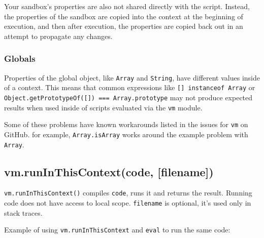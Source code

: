 Your sandbox's properties are also not shared directly with the script.
Instead, the properties of the sandbox are copied into the context at
the beginning of execution, and then after execution, the properties are
copied back out in an attempt to propagate any changes.

\subsubsection{Globals}

Properties of the global object, like \texttt{Array} and
\texttt{String}, have different values inside of a context. This means
that common expressions like \texttt{{[}{]} instanceof Array} or
\texttt{Object.getPrototypeOf({[}{]}) === Array.prototype} may not
produce expected results when used inside of scripts evaluated via the
\texttt{vm} module.

Some of these problems have known workarounds listed in the issues for
\texttt{vm} on GitHub. for example, \texttt{Array.isArray} works around
the example problem with \texttt{Array}.

\subsection{vm.runInThisContext(code, {[}filename{]})}

\texttt{vm.runInThisContext()} compiles \texttt{code}, runs it and
returns the result. Running code does not have access to local scope.
\texttt{filename} is optional, it's used only in stack traces.

Example of using \texttt{vm.runInThisContext} and \texttt{eval} to run
the same code:

\begin{Shaded}
\begin{Highlighting}[]
 \NormalTok{,}
    \NormalTok{);}

\NormalTok{(}\NormalTok{,}
  \NormalTok{);}
\NormalTok{(}  \NormalTok{+}
\NormalTok{);}
\NormalTok{(}  \NormalTok{+}

\end{Highlighting}
\end{Shaded}

